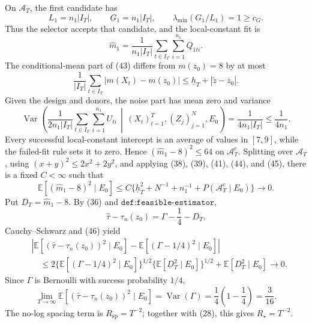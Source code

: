 On \(\mathcal A_T\), the first candidate has
\[
L_1=n_1|I_T|,
\qquad
G_1=n_1|I_T|,
\qquad
\lambda_{\min}(G_1/L_1)=1\ge c_G.
\tag{42}
\]
Thus the selector accepts that candidate, and the local-constant fit is
\[
\widehat m_1
=\frac1{n_1|I_T|}
\sum_{t\in I_T}\sum_{i=1}^{n_1}Q_{1ti}.
\tag{43}
\]
The conditional-mean part of (43) differs from \(m(z_0)=8\) by at most
\[
\frac1{|I_T|}\sum_{t\in I_T}|m(X_t)-m(z_0)|
\le\underline h_T+|\widetilde z-z_0|.
\tag{44}
\]
Given the design and donors, the noise part has mean zero and variance
\[
\operatorname{Var}\!\left(
\frac1{2n_1|I_T|}\sum_{t\in I_T}\sum_{i=1}^{n_1}U_{ti}
\,\middle|\,(X_t)_{t=1}^{T},(Z_j)_{j=1}^{N},E_0
\right)
=\frac1{4n_1|I_T|}
\le\frac1{4n_1}.
\tag{45}
\]
Every successful local-constant intercept is an average of values in \([7,9]\), while the failed-fit rule sets it to zero.  Hence \((\widehat m_1-8)^2\le64\) on \(\mathcal A_T^c\).  Splitting over \(\mathcal A_T\), using \((x+y)^2\le2x^2+2y^2\), and applying (38), (39), (41), (44), and (45), there is a fixed \(C<\infty\) such that
\[
\mathbb E[(\widehat m_1-8)^2\mid E_0]
\le C\{\underline h_T^2+N^{-1}+n_1^{-1}
+P(\mathcal A_T^c\mid E_0)\}
\longrightarrow0.
\tag{46}
\]
Put \(D_T=\widehat m_1-8\).  By (36) and \(\texttt{def:feasible-estimator}\),
\[
\widehat\tau-\tau_n(z_0)=\Gamma-\frac14-D_T.
\tag{47}
\]
Cauchy--Schwarz and (46) yield
\[
\begin{aligned}
&\left|
\mathbb E[(\widehat\tau-\tau_n(z_0))^2\mid E_0]
-\mathbb E[(\Gamma-1/4)^2\mid E_0]
\right|\\
&\quad\le
2\{\mathbb E[(\Gamma-1/4)^2\mid E_0]\}^{1/2}
\{\mathbb E[D_T^2\mid E_0]\}^{1/2}
+\mathbb E[D_T^2\mid E_0]
\longrightarrow0.
\end{aligned}
\tag{48}
\]
Since \(\Gamma\) is Bernoulli with success probability \(1/4\),
\[
\lim_{T\to\infty}
\mathbb E[(\widehat\tau-\tau_n(z_0))^2\mid E_0]
=\operatorname{Var}(\Gamma)
=\frac14\left(1-\frac14\right)
=\frac3{16}.
\tag{49}
\]
The no-log spacing term is \(R_{\mathrm{sp}}=T^{-2}\); together with (28), this gives \(R_\star=T^{-2}\).


